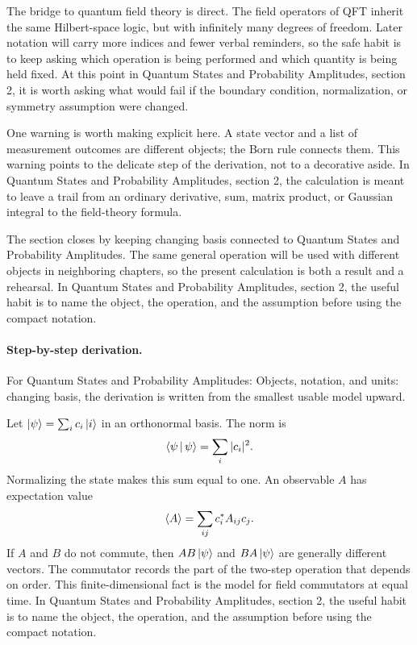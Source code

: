 The bridge to quantum field theory is direct.  The field operators of QFT inherit the same Hilbert-space logic, but with infinitely many degrees of freedom.  Later notation will carry more indices and fewer verbal reminders, so the safe habit is to keep asking which operation is being performed and which quantity is being held fixed.  At this point in Quantum States and Probability Amplitudes, section 2, it is worth asking what would fail if the boundary condition, normalization, or symmetry assumption were changed.

One warning is worth making explicit here.  A state vector and a list of measurement outcomes are different objects; the Born rule connects them.  This warning points to the delicate step of the derivation, not to a decorative aside.  In Quantum States and Probability Amplitudes, section 2, the calculation is meant to leave a trail from an ordinary derivative, sum, matrix product, or Gaussian integral to the field-theory formula.

The section closes by keeping changing basis connected to Quantum States and Probability Amplitudes.  The same general operation will be used with different objects in neighboring chapters, so the present calculation is both a result and a rehearsal.  In Quantum States and Probability Amplitudes, section 2, the useful habit is to name the object, the operation, and the assumption before using the compact notation.



\paragraph{Step-by-step derivation.}

For Quantum States and Probability Amplitudes: Objects, notation, and units: changing basis, the derivation is written from the smallest usable model upward.

Let \(\left|\psi\right\rangle=\sum_i c_i\left|i\right\rangle\) in an orthonormal basis.  The norm is
\[
  \left\langle \psi\,\middle|\,\psi\right\rangle=\sum_i |c_i|^2.
\]
Normalizing the state makes this sum equal to one.  An observable \(A\) has expectation value
\[
  \left\langle A\right\rangle=\sum_{ij}c_i^*A_{ij}c_j.
\]
If \(A\) and \(B\) do not commute, then \(AB\left|\psi\right\rangle\) and \(BA\left|\psi\right\rangle\) are generally different vectors.  The commutator records the part of the two-step operation that depends on order.  This finite-dimensional fact is the model for field commutators at equal time.  In Quantum States and Probability Amplitudes, section 2, the useful habit is to name the object, the operation, and the assumption before using the compact notation.


